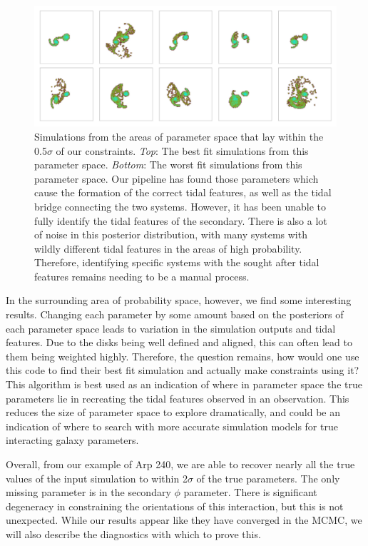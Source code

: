 \begin{figure}
    \centering
    \includegraphics[width=\textwidth]{Chapter1/figures/best-fits-comb.pdf}
    \caption{Simulations from the areas of parameter space that lay within the 0.5$\sigma$ of our constraints. \textit{Top}: The best fit simulations from this parameter space. \textit{Bottom}: The worst fit simulations from this parameter space. Our pipeline has found those parameters which cause the formation of the correct tidal features, as well as the tidal bridge connecting the two systems. However, it has been unable to fully identify the tidal features of the secondary. There is also a lot of noise in this posterior distribution, with many systems with wildly different tidal features in the areas of high probability. Therefore, identifying specific systems with the sought after tidal features remains needing to be a manual process.}
    \label{fig:arp240_corner_plot}
\end{figure}

In the surrounding area of probability space, however, we find some interesting results. Changing each parameter by some amount based on the posteriors of each parameter space leads to variation in the simulation outputs and tidal features. Due to the disks being well defined and aligned, this can often lead to them being weighted highly. Therefore, the question remains, how would one use this code to find their best fit simulation and actually make constraints using it? This algorithm is best used as an indication of where in parameter space the true parameters lie in recreating the tidal features observed in an observation. This reduces the size of parameter space to explore dramatically, and could be an indication of where to search with more accurate simulation models for true interacting galaxy parameters.

Overall, from our example of Arp 240, we are able to recover nearly all the true values of the input simulation to within 2$\sigma$ of the true parameters. The only missing parameter is in the secondary $\phi$ parameter. There is significant degeneracy in constraining the orientations of this interaction, but this is not unexpected. While our results appear like they have converged in the MCMC, we will also describe the diagnostics with which to prove this. 

